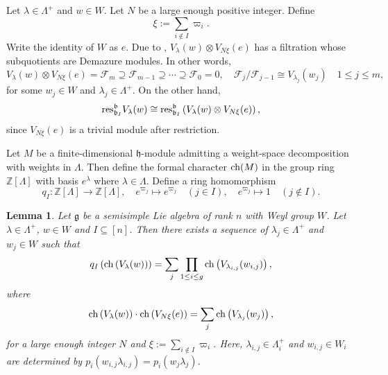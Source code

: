 \documentclass[12pt]{amsart}
\newtheorem{lemma}[theorem]{Lemma}
\theoremstyle{definition}
\theoremstyle{remark}
\newcommand{\Z}{\mathbb{Z}}
\begin{document}
Let $\lambda \in \Lambda^+$ and $w \in W$. Let $N$ be a large enough positive integer. Define
\begin{equation}\label{eqn3.7}
\xi:= \sum_{i \notin I} \varpi_i.
\end{equation}
Write the identity of $W$ as $e$. Due to \cite[Theorem~1]{MR1016897}, $V_\lambda (w) \otimes V_{N \xi} (e)$ has a filtration whose subquotients are Demazure modules. In other words,
\begin{equation}\label{eqn3.8}
V_\lambda (w) \otimes V_{N \xi} (e) = \mathcal{F}_m \supseteq \mathcal{F}_{m-1} \supseteq \cdots \supseteq \mathcal{F}_0 = 0, \quad \mathcal{F}_j / \mathcal{F}_{j-1} \cong V_{\lambda_j}(w_j) \quad 1 \leq j \leq m,
\end{equation}
for some $w_j \in W$ and $\lambda_j \in \Lambda^+$. On the other hand,
\begin{equation}\label{eqn3.9}
{\rm res}_{\mathfrak{b}_I}^\mathfrak{b} V_\lambda (w) \cong {\rm res}_{\mathfrak{b}_I}^\mathfrak{b} \left( V_\lambda (w) \otimes V_{N \xi}(e) \right),
\end{equation}
since $V_{N \xi}(e)$ is a trivial module after restriction.

Let $M$ be a finite-dimensional $\mathfrak{h}$-module admitting a weight-space decomposition with weights in $\Lambda$. Then define the formal character ${\rm ch} (M)$ in the group ring $\Z [\Lambda]$ with basis $e^\lambda$ where $\lambda \in \Lambda$. Define a ring homomorphism
\begin{equation}\label{eqn3.10}
q_I: \Z [\Lambda] \rightarrow \Z [\Lambda ] , \quad e^{\varpi_j} \mapsto e^{\varpi_j} \quad (j \in I), \quad  e^{\varpi_j} \mapsto 1 \quad (j \notin I).
\end{equation}

\begin{lemma}\label{lem3.2}
Let $\mathfrak{g}$ be a semisimple Lie algebra of rank $n$ with Weyl group $W$. Let $\lambda \in \Lambda^+$, $w \in W$ and $I \subseteq [n]$. Then there exists a sequence of $\lambda_j \in \Lambda^+$ and $w_j \in W$ such that
\begin{equation}
q_I \left( {\rm ch} \left( V_\lambda (w) \right) \right) = \sum_j \prod_{1 \leq i \leq g} {\rm ch} \left( V_{\lambda_{i,j}}(w_{i,j} ) \right),
\end{equation}
where
\begin{equation}
{\rm ch}\left( V_\lambda (w) \right) \cdot {\rm ch}\left( V_{N\xi} (e) \right) = \sum_{j} {\rm ch}\left( V_{\lambda_j} (w_j) \right),
\end{equation}
for a large enough integer $N$ and $\xi := \sum_{i \notin I} \varpi_i$. Here, $\lambda_{i,j} \in \Lambda_i^+$ and $w_{i,j} \in W_i$ are determined by $p_i (w_{i,j} \lambda_{i,j} )= p_i (w_j \lambda_j)$.
\end{lemma}
\end{document}
